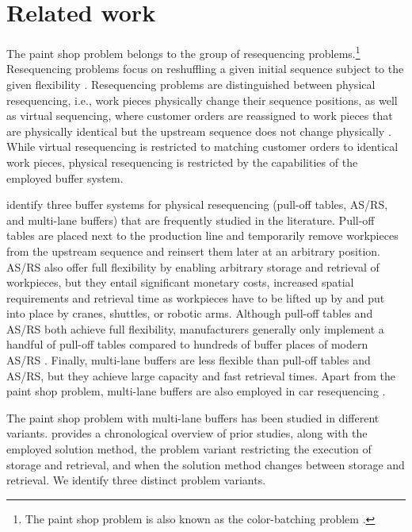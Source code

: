 \documentclass[11pt]{elsarticle}
\begin{document}
\section{Related work}
\label{sec:rw}


The paint shop problem belongs to the group of resequencing problems.\footnote{The paint shop problem is also known as the color-batching problem \citep[e.g.,][]{Sun.2024, taube2018resequencing}.} Resequencing problems focus on reshuffling a given initial sequence subject to the given flexibility \citep{boysen_resequencing_2012}. Resequencing problems are distinguished between physical resequencing, i.e., work pieces physically change their sequence positions, as well as virtual sequencing, where customer orders are reassigned to work pieces that are physically identical but the upstream sequence does not change physically \citep{Sun.2024}. While virtual resequencing is restricted to matching customer orders to identical work pieces, physical resequencing is restricted by the capabilities of the employed buffer system.

 
\citet{boysen_resequencing_2012} identify three buffer systems for physical resequencing (pull-off tables, AS/RS, and multi-lane buffers) that are frequently studied in the literature. Pull-off tables are placed next to the production line and temporarily remove workpieces from the upstream sequence and reinsert them later at an arbitrary position. AS/RS also offer full flexibility by enabling arbitrary storage and retrieval of workpieces, but they entail significant monetary costs, increased spatial requirements and retrieval time as workpieces have to be lifted up by and put into place by cranes, shuttles, or robotic arms. 
Although pull-off tables and AS/RS both achieve full flexibility, manufacturers generally only implement a handful of pull-off tables compared to hundreds of buffer places of modern AS/RS \citep{boysen_resequencing_2012}. Finally, multi-lane buffers are less flexible than pull-off tables and AS/RS, but they achieve large capacity and fast retrieval times. Apart from the paint shop problem, multi-lane buffers are also employed in car resequencing \citep[e.g.,][]{Boysen.2013,Valero.2014}.



The paint shop problem with multi-lane buffers has been studied in different variants.  provides a chronological overview of prior studies, along with the employed solution method, the problem variant restricting the execution of storage and retrieval, and when the solution method changes between storage and retrieval. We identify three distinct problem variants.
\end{document}
